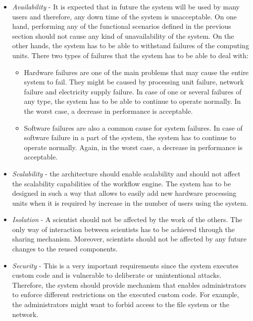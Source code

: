 \begin{itemize}

	\item \textit{Availability} - It is expected that in future the system will be used by many users and therefore, any down time of the system is unacceptable. On one hand, performing any of the functional scenarios defined in the previous section should not cause any kind of unavailability of the system. On the other hands, the system has to be able to withstand failures of the computing units. There two types of failures that the system has to be able to deal with:
	
	\begin{itemize}
	\item Hardware failures are one of the main problems that may cause the entire system to fail. They might be caused by processing unit failure, network failure and electricity supply failure. In case of one or several failures of any type, the system has to be able to continue to operate normally. In the worst case, a decrease in performance is acceptable.
	\item Software failures are also a common cause for system failures. In case of software failure in a part of the system, the system has to continue to operate normally. Again, in the worst case, a decrease in performance is acceptable. 
	\end{itemize}
	
	\item \textit{Scalability} - the architecture should enable scalability and should not affect the scalability capabilities of the workflow engine. The system has to be designed in such a way that allows to easily add new hardware processing units when it is required by increase in the number of users using the system.
	
	\item \textit{Isolation} - A scientist should not be affected by the work of the others. The only way of interaction between scientists has to be achieved through the sharing mechanism. Moreover, scientists should not be affected by any future changes to the reused components.
		
	\item \textit{Security} - This is a very important requirements since the system executes custom code and is vulnerable to deliberate or unintentional attacks. Therefore, the system should provide mechanism that enables administrators to enforce different restrictions on the executed custom code. For example, the administrators might want to forbid access to the file system or the network.
	

\end{itemize}
